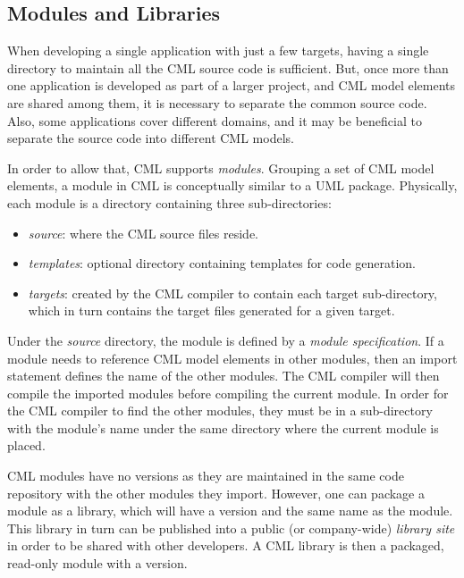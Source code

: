 \subsection{Modules and Libraries}\label{subsec:modlib}

When developing a single application with just a few targets,
having a single directory to maintain all the CML source code is sufficient.
But, once more than one application is developed as part of a larger project,
and CML model elements are shared among them,
it is necessary to separate the common source code.
Also, some applications cover different domains,
and it may be beneficial to separate the source code into different CML models.

In order to allow that, CML supports \emph{modules}.
Grouping a set of CML model elements,
a module in CML is conceptually similar to a UML \cite{uml} package.
Physically, each module is a directory containing three sub-directories:

\begin{itemize}
\item \emph{source}: where the CML source files reside.
\item \emph{templates}: optional directory containing templates for code generation.
\item \emph{targets}: created by the CML compiler to contain each target sub-directory, which in turn contains the target files generated for a given target.
\end{itemize}

Under the \emph{source} directory, the module is defined by a \emph{module specification}.
If a module needs to reference CML model elements in other modules,
then an import statement defines the name of the other modules.
The CML compiler will then compile the imported modules
before compiling the current module.
In order for the CML compiler to find the other modules,
they must be in a sub-directory with the module's name
under the same directory where the current module is placed.

CML modules have no versions
as they are maintained in the same code repository with the other modules they import.
However, one can package a module as a library,
which will have a version and the same name as the module.
This library in turn can be published into a public (or company-wide) \emph{library site}
in order to be shared with other developers.
A CML library is then a packaged, read-only module with a version.
